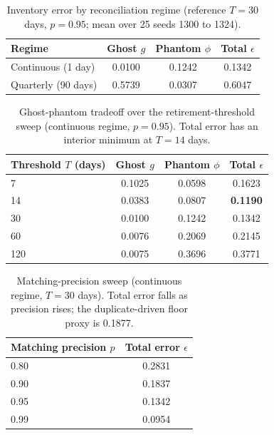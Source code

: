 \documentclass[journal]{IEEEtran}
\begin{document}
\begin{table}[t]
\centering
\caption{Inventory error by reconciliation regime (reference $T = 30$ days, $p = 0.95$; mean over 25
seeds 1300 to 1324).}
\label{tab:regime}
\footnotesize
\setlength{\tabcolsep}{5pt}
\begin{tabular}{@{}lccc@{}}
\toprule
Regime & Ghost $g$ & Phantom $\phi$ & Total $\epsilon$ \\
\midrule
Continuous (1 day)      & 0.0100 & 0.1242 & 0.1342 \\
Quarterly (90 days)     & 0.5739 & 0.0307 & 0.6047 \\
\bottomrule
\end{tabular}
\end{table}

\begin{table}[t]
\centering
\caption{Ghost-phantom tradeoff over the retirement-threshold sweep (continuous regime, $p = 0.95$).
Total error has an interior minimum at $T = 14$ days.}
\label{tab:threshold}
\footnotesize
\setlength{\tabcolsep}{6pt}
\begin{tabular}{@{}lccc@{}}
\toprule
Threshold $T$ (days) & Ghost $g$ & Phantom $\phi$ & Total $\epsilon$ \\
\midrule
7   & 0.1025 & 0.0598 & 0.1623 \\
14  & 0.0383 & 0.0807 & \textbf{0.1190} \\
30  & 0.0100 & 0.1242 & 0.1342 \\
60  & 0.0076 & 0.2069 & 0.2145 \\
120 & 0.0075 & 0.3696 & 0.3771 \\
\bottomrule
\end{tabular}
\end{table}

\begin{table}[t]
\centering
\caption{Matching-precision sweep (continuous regime, $T = 30$ days). Total error falls as precision
rises; the duplicate-driven floor proxy is 0.1877.}
\label{tab:precision}
\footnotesize
\setlength{\tabcolsep}{8pt}
\begin{tabular}{@{}lc@{}}
\toprule
Matching precision $p$ & Total error $\epsilon$ \\
\midrule
0.80 & 0.2831 \\
0.90 & 0.1837 \\
0.95 & 0.1342 \\
0.99 & 0.0954 \\
\bottomrule
\end{tabular}
\end{table}
\end{document}
